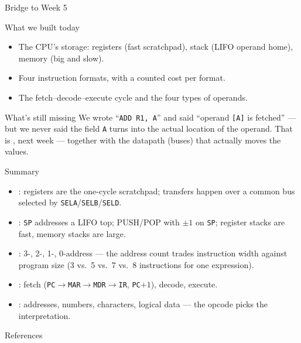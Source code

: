 \documentclass[aspectratio=169]{beamer}
\begin{document}
\begin{frame}{Bridge to Week 5}
  \begin{block}{What we built today}
    \begin{itemize}
      \item The CPU's storage: registers (fast scratchpad), stack (LIFO operand
        home), memory (big and slow).
      \item Four instruction formats, with a counted cost per format.
      \item The fetch--decode--execute cycle and the four types of operands.
    \end{itemize}
  \end{block}
  \begin{exampleblock}{What's still missing}
    We wrote ``\texttt{ADD R1, A}'' and said ``operand \texttt{[A]} is
    fetched'' --- but we never said  the field \texttt{A} turns into the
    actual location of the operand. That is , next week ---
    together with the datapath (buses) that actually moves the values.
  \end{exampleblock}
\end{frame}

\begin{frame}{Summary}
  \begin{itemize}
    \item {}: registers are the one-cycle scratchpad;
      transfers happen over a common bus selected by \texttt{SELA}/\texttt{SELB}/\texttt{SELD}.
    \item {}: \texttt{SP} addresses a LIFO top; PUSH/POP
      with $\pm 1$ on \texttt{SP}; register stacks are fast, memory stacks are
      large.
    \item {}: 3-, 2-, 1-, 0-address --- the address count
      trades instruction width against program size (3 vs.\ 5 vs.\ 7 vs.\ 8
      instructions for one expression).
    \item {}: fetch (\texttt{PC}$\to$\texttt{MAR}$\to$\texttt{MDR}$\to$\texttt{IR},
      \texttt{PC}${+}1$), decode, execute.
    \item {}: addresses, numbers, characters, logical data ---
      the opcode picks the interpretation.
  \end{itemize}
\end{frame}

\begin{frame}{References}
  \footnotesize
  
  
\end{frame}
\end{document}
